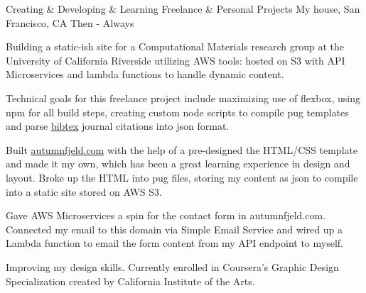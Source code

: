 \begin{cventries}
  \cventry
    {Creating \& Developing \& Learning}    
    {Freelance \& Personal Projects}
    {My house, San Francisco, CA}
    {Then - Always}
    {
      \begin{cvitems}
        \item {Building a static-ish site for a Computational Materials research group at the University of California Riverside utilizing AWS tools: hosted on S3 with API Microservices and lambda functions to handle dynamic content.} 
        \item {Technical goals for this freelance project include maximizing use of flexbox, using npm for all build steps, creating custom node scripts to compile pug templates and parse \href{http://www.bibtex.org/About}{bibtex} journal citations into json format.}      
        \item { Built \href{http://autumnfjeld.com}{autumnfjeld.com} with the help of a pre-designed the HTML/CSS template and made it my own, which has been a great learning experience in design and layout. Broke up the HTML into pug files, storing my content as json to compile into a static site stored on AWS S3.} 
        \item {Gave AWS Microservices a spin for the contact form in autumnfjeld.com. Connected my email to this domain via Simple Email Service and wired up a Lambda function to email the form content from my API endpoint to myself.} 
        \item {Improving my design skills. Currently enrolled in Coursera's Graphic Design Specialization created by California Institute of the Arts.} 
      \end{cvitems}
    }
    

\end{cventries}
